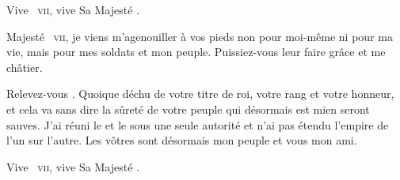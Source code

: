 \begin{drama}
  \peuplespeaks Vive \elena~\textsc{vii}, vive Sa Majesté \ela.

  \dariusspeaks {} Majesté \elena~\textsc{vii}, je viens m’agenouiller à vos pieds non pour moi-même ni pour ma vie, mais pour mes soldats et mon peuple. Puissiez-vous leur faire grâce et me châtier.

  \elenaspeaks Relevez-vous \darius. Quoique déchu de votre titre de roi, votre rang et votre honneur, et cela va sans dire la sûreté de votre peuple qui désormais est mien seront sauves. J’ai réuni le \campprincipal{} et le \campoppose{} sous une seule autorité et n’ai pas étendu l’empire de l’un sur l’autre. Les vôtres sont désormais mon peuple et vous mon ami.

   Vive \elena~\textsc{vii}, vive Sa Majesté \ela.



\end{drama}








